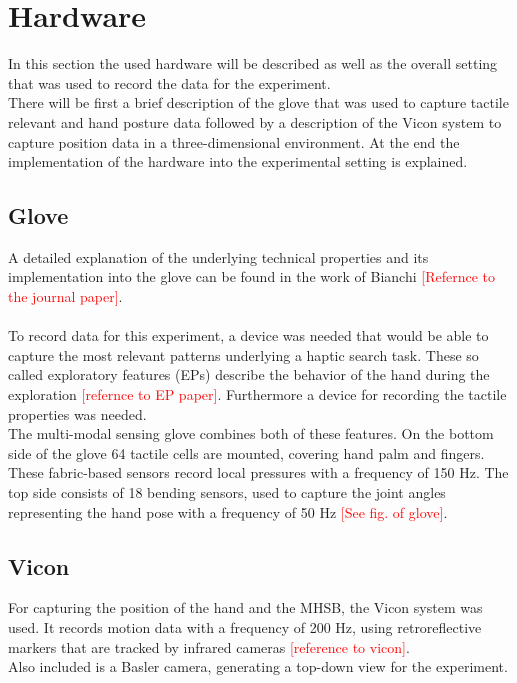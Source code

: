 \section{Hardware}
In this section the used hardware will be described as well as the overall setting that was used to record the data for the experiment.\\
There will be first a brief description of the glove that was used to capture tactile relevant and hand posture data followed by a description of the Vicon system to capture position data in a three-dimensional environment. At the end the implementation of the hardware into the experimental setting is explained.

\subsection{Glove}
A detailed explanation of the underlying technical properties and its implementation into the glove can be found in the work of Bianchi \textcolor{red}{[Refernce to the journal paper]}.\\
\\
To record data for this experiment, a device was needed that would be able to capture the most relevant patterns underlying a haptic search task. These so called exploratory features (EPs) describe the behavior of the hand during the exploration \textcolor{red}{[refernce to EP paper]}. Furthermore a device for recording the tactile properties was needed.\\
The multi-modal sensing glove combines both of these features. On the bottom side of the glove 64 tactile cells are mounted, covering hand palm and fingers. These fabric-based sensors record local pressures with a frequency of 150 Hz. The top side consists of 18 bending sensors, used to capture the joint angles representing the hand pose with a frequency of 50 Hz \textcolor{red}{[See fig. of glove]}.
 
\subsection{Vicon}
For capturing the position of the hand and the MHSB, the Vicon system was used. It records motion data with a frequency of 200 Hz, using retroreflective markers that are tracked by infrared cameras \textcolor{red}{[reference to vicon]}.\\
Also included is a Basler camera, generating a top-down view for the experiment.

